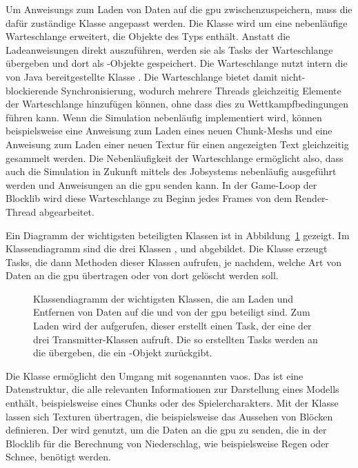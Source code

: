 Um \glspl{Anweisung} zum Laden von Daten auf die \ac{gpu} zwischenzuspeichern, muss die dafür zuständige Klasse \classLoader{} angepasst werden. Die Klasse wird um eine nebenläufige Warteschlange erweitert, die Objekte des Typs \classRunnable{} enthält. Anstatt die Ladeanweisungen direkt auszuführen, werden sie als Tasks der Warteschlange übergeben und dort als \classRunnable{}-Objekte gespeichert. Die Warteschlange nutzt intern die von Java bereitgestellte Klasse \classConcurrentLinkedQueue{}. Die Warteschlange bietet damit nicht-blockierende Synchronisierung, wodurch mehrere Threads gleichzeitig Elemente der Warteschlange hinzufügen können, ohne dass dies zu Wettkampfbedingungen führen kann. Wenn die Simulation nebenläufig implementiert wird, können beispielsweise eine Anweisung zum Laden eines neuen Chunk-Meshs und eine Anweisung zum Laden einer neuen Textur für einen angezeigten Text gleichzeitig gesammelt werden. Die Nebenläufigkeit der Warteschlange ermöglicht also, dass auch die Simulation in Zukunft mittels des Jobsystems nebenläufig ausgeführt werden und Anweisungen an die \ac{gpu} senden kann. In der Game-Loop der Blocklib wird diese Warteschlange zu Beginn jedes Frames von dem Render-Thread abgearbeitet.

Ein Diagramm der wichtigsten beteiligten Klassen ist in Abbildung~\ref{fig:loaderDiagram} gezeigt. Im Klassendiagramm sind die drei Klassen \classVAOTransmitter{}, \classTextureTransmitter{} und \classDataTransmitter{} abgebildet. Die Klasse \classLoader{} erzeugt Tasks, die dann Methoden dieser Klassen aufrufen, je nachdem, welche Art von Daten an die \ac{gpu} übertragen oder von dort gelöscht werden soll.

\begin{figure}[htbp]
	\centering
	
	\caption[Klassendiagramm der wichtigsten Klassen, die am Laden und Entfernen von Daten auf die und von der  beteiligt sind.]{Klassendiagramm der wichtigsten Klassen, die am Laden und Entfernen von Daten auf die und von der \ac{gpu} beteiligt sind. Zum Laden wird der \classLoader{} aufgerufen, dieser erstellt einen Task, der eine der drei Transmitter-Klassen aufruft. Die so erstellten Tasks werden an die \classDoubleBufferedAsyncQueue{} übergeben, die ein \classCompletableFuture{}-Objekt zurückgibt.}\label{fig:loaderDiagram}
\end{figure}

Die Klasse \classVAOTransmitter{} ermöglicht den Umgang mit sogenannten \acp{vao}. Das ist eine Datenstruktur, die alle relevanten Informationen zur Darstellung eines Modells enthält, beispielsweise eines Chunks oder des Spielercharakters. Mit der Klasse \classTextureTransmitter{} lassen sich Texturen übertragen, die beispielsweise das Aussehen von Blöcken definieren. Der \classDataTransmitter{} wird genutzt, um die Daten an die \ac{gpu} zu senden, die in der Blocklib für die Berechnung von Niederschlag, wie beispielsweise Regen oder Schnee, benötigt werden.

